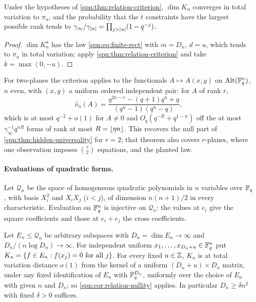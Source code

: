 \begin{corollary}\label{spn:cor:relation-nullity}
Under the hypotheses of \cref{spn:thm:relation-criterion}, $\dim K_n$ converges in total variation to
$\pi_u$, and the probability that the $t$ constraints have the largest possible rank tends to
$\gamma_\infty/\gamma_{\lvert u\rvert}=\prod_{j>\lvert u\rvert}(1-q^{-j})$.
\end{corollary}

\begin{proof}
$\dim K_n^{\mathrm u}$ has the law \eqref{spn:eq:finite-rect} with $m=D_n$, $d=u$, which tends to
$\pi_u$ in total variation; apply \cref{spn:thm:relation-criterion} and take $k=\max(0,-u)$.
\end{proof}

For two-planes the criterion applies to the functionals $A\mapsto A(x,y)$ on $\operatorname{Alt}(\mathbb{F}_q^n)$, $n$
even, with $(x,y)$ a uniform ordered independent pair: for $A$ of rank $r$,
\[
 \widehat\nu_n(A)=\frac{q^{2n-r}-(q+1)q^n+q}{(q^n-1)(q^n-q)},
\]
which is at most $q^{-2}+o(1)$ for $A\ne0$ and $O_q(q^{-R}+q^{1-n})$ off the at most
$\gamma_\infty^{-1}q^{nR}$ forms of rank at most $R=\lfloor\eta n\rfloor$. This recovers the null part of
\cref{spn:thm:hidden-universality} for $r=2$; that theorem also covers $r$-planes, where one
observation imposes $\binom r2$ equations, and the planted law.

\paragraph{Evaluations of quadratic forms.}
Let $\mathcal Q_n$ be the space of homogeneous quadratic polynomials in $n$ variables over $\mathbb{F}_q$,
with basis $X_i^2$ and $X_iX_j$ ($i<j$), of dimension $n(n+1)/2$ in every characteristic. Evaluation on
$\mathbb{F}_q^n$ is injective on $\mathcal Q_n$: the values at $e_i$ give the square coefficients and those at
$e_i+e_j$ the cross coefficients.

\begin{theorem}\label{spn:thm:relation-quadratics}
Let $E_n\le\mathcal Q_n$ be arbitrary subspaces with $D_n=\dim E_n\to\infty$ and
$D_n/(n\log D_n)\to\infty$. For independent uniform $x_1,\dots,x_{D_n+u}\in\mathbb{F}_q^n$ put
$K_n=\{f\in E_n:f(x_j)=0\text{ for all }j\}$. For every fixed $u\in\mathbb{Z}$, $K_n$ is at total variation
distance $o(1)$ from the kernel of a uniform $(D_n+u)\times D_n$ matrix, under any fixed identification
of $E_n$ with $\mathbb{F}_q^{D_n}$, uniformly over the choice of $E_n$ with given $n$ and $D_n$; so
\cref{spn:cor:relation-nullity} applies. In particular $D_n\ge\delta n^2$ with fixed $\delta>0$
suffices.
\end{theorem}

